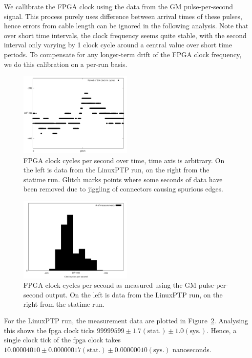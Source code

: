 \documentclass{article}
\begin{document}
We callibrate the FPGA clock using the data from the GM pulse-per-second signal. This process purely uses difference between arrival times of these pulses, hence errors from cable length can be ignored in the following analysis. Note that over short time intervals, the clock frequency seems quite stable, with the second interval only varying by 1 clock cycle around a central value over short time periods. To compensate for any longer-term drift of the FPGA clock frequency, we do this calibration on a per-run basis.

\begin{figure}[h]
\includegraphics[width=0.5\textwidth]{gm_clocks_overtime_ref.pdf}
\caption{FPGA clock cycles per second over time, time axis is arbitrary. On the left is data from the LinuxPTP run, on the right from the statime run. Glitch marks points where some seconds of data have been removed due to jiggling of connectors causing spurious edges.}
\label{fig:gm_cycles_over_time}
\end{figure}

\begin{figure}[h]
\includegraphics[width=0.5\textwidth]{gm_clocks_per_sec_ref.pdf}
\caption{FPGA clock cycles per second as measured using the GM pulse-per-second output. On the left is data from the LinuxPTP run, on the right from the statime run.}
\label{fig:gm_cycles_per_second}
\end{figure}

For the LinuxPTP run, the measurement data are plotted in Figure~\ref{fig:gm_cycles_per_second}. Analysing this shows the fpga clock ticks $99999599\pm 1.7 (\text{stat.}) \pm 1.0 (\text{sys.})$. Hence, a single clock tick of the fpga clock takes $10.00004010 \pm 0.00000017 (\text{stat.}) \pm 0.00000010 (\text{sys.})$ nanoseconds.
\end{document}
